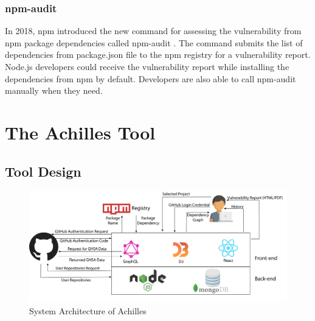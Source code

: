 \documentclass[conference]{IEEEtran}
\begin{document}
	\subsubsection{npm-audit}
	In 2018, npm introduced the new command for assessing the vulnerability from npm package dependencies called npm-audit \citep{webnpm-audit}.
	The command submits the list of dependencies from package.json file to the npm registry for a vulnerability report.
	Node.js developers could receive the vulnerability report while installing the dependencies from npm by default.
	Developers are also able to call npm-audit manually when they need.
	
	\section{The Achilles Tool}
	\subsection{Tool Design}
	\begin{figure}[tb]
		\centering
		\includegraphics[width=\columnwidth]{Figures/SystemArch.png}
		\caption{System Architecture of Achilles}
		\label{fig:system_architecture}
	\end{figure}
	
\end{document}
